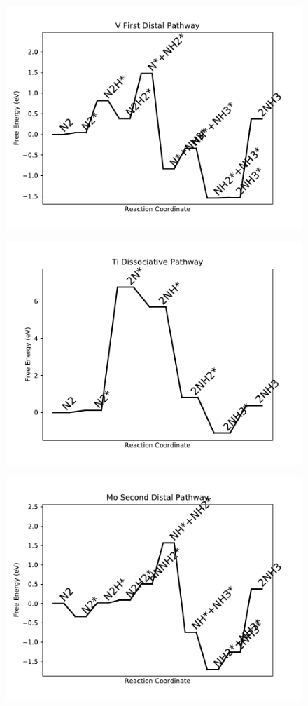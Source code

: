 \begin{figure}
\centering
\includegraphics[width=0.8\linewidth]{data/plots/V_distal_1.pdf}
\end{figure}

\begin{figure}
\centering
\includegraphics[width=0.8\linewidth]{data/plots/Ti_dissociative.pdf}
\end{figure}

\begin{figure}
\centering
\includegraphics[width=0.8\linewidth]{data/plots/Mo_distal_2.pdf}
\end{figure}

